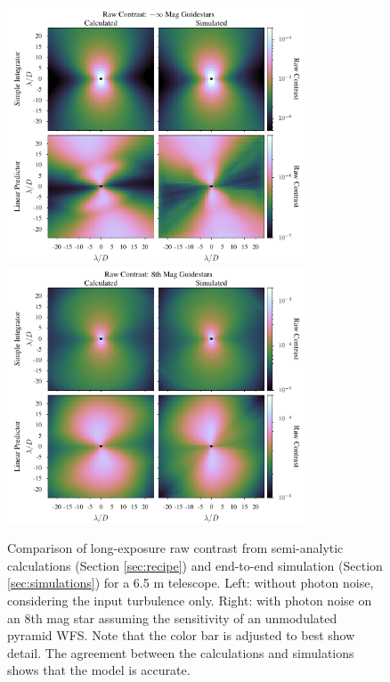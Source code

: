 \documentclass[10pt,preprint]{aastex631}
\begin{document}
\begin{figure}
\hspace{-0.3in}
\includegraphics[width=3.54in]{contrast0mag.pdf}
\includegraphics[width=3.54in]{contrast8mag.pdf}
\caption{Comparison of long-exposure raw contrast from semi-analytic calculations (Section \ref{sec:recipe}) and end-to-end simulation (Section \ref{sec:simulations}) for a 6.5 m telescope. Left: without photon noise, considering the input turbulence only.  Right: with photon noise on an 8th mag star assuming the sensitivity of an unmodulated pyramid WFS. Note that the color bar is adjusted to best show detail.  The agreement between the calculations and simulations shows that the model is accurate.\label{fig:contrast_2Dcomp}}
\end{figure}
\end{document}
